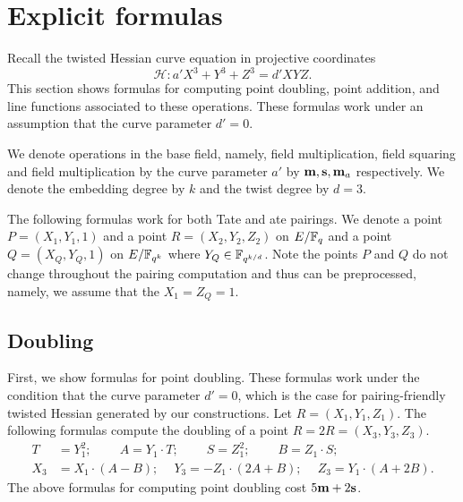 \section{Explicit formulas}
\label{sec:formulas}

Recall the twisted Hessian curve equation in projective coordinates
$$ \mathcal{H}: a' X^3 + Y^3 + Z^3 = d' X Y Z. $$
This section shows formulas for computing point doubling, point addition,
and line functions associated to these operations.
These formulas work under an assumption that the curve parameter $d' = 0$.

We denote operations in the base field, namely, 
field multiplication, field squaring and field multiplication by the curve parameter $a'$
by $\textbf{m}, \textbf{s}, \textbf{m}_{a}$ respectively.
We denote the embedding degree by $k$ and the twist degree by $d=3$.

The following formulas work for both Tate and ate pairings.
We denote a point $P = (X_1,Y_1,1)$ and a point $R = (X_2,Y_2,Z_2)$ on $E/\mathbb{F}_{q}$
and a point $Q = (X_{Q},Y_{Q},1)$ on $E/\mathbb{F}_{q^{k}}$ where $Y_Q \in \mathbb{F}_{q^{k/d}}$.
Note the points $P$ and $Q$ do not change throughout the pairing computation and thus can be preprocessed,
namely, we assume that the $X_1 = Z_{Q} = 1$.


\subsection{Doubling}
First, we show formulas for point doubling.
These formulas work under the condition that the curve parameter $d'=0$,
which is the case for pairing-friendly twisted Hessian generated by our constructions.
Let $R = (X_1, Y_1, Z_1)$.
The following formulas compute the doubling of a point $R = 2R = (X_3,Y_3,Z_3)$.
\begin{align*}
T &= Y_1^2;\	\qquad	A = Y_1 \cdot T;\	\qquad
S = Z_1 ^ 2;\	\qquad	B = Z_1 \cdot S;\\
X_3 &= X_1 \cdot (A - B);\	\quad
Y_3 = -Z_1 \cdot (2A + B);\	\quad
Z_3 = Y_1 \cdot (A + 2B).
\end{align*}
The above formulas for computing point doubling
cost $5\textbf{m} + 2\textbf{s}$. %

